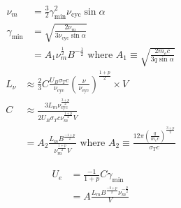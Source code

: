 \begin{enumerate}
{	\begin{multicols}{2}
		\raggedcolumns
		\begin{align*}
			\nu_m &= \frac{3}{2}\gamma_\text{min}^2\nu_\text{cyc}\sin\alpha\\
			\gamma_\text{min} &= \sqrt{\frac{2\nu_m}{3\nu_\text{cyc}\sin\alpha}}\\
				&= A_1\nu_m^\frac{1}{2}B^{-\frac{1}{2}} \text{ where } A_1 \equiv \sqrt{\frac{2m_ec}{3q\sin\alpha}} 
		\end{align*}
		\vfill\columnbreak
		\begin{align*}
			L_\nu &\approx \frac{2}{3}C\frac{U_B\sigma_Tc}{\nu_\text{cyc}}\left(\frac{\nu}{\nu_\text{cyc}}\right)^\frac{1+p}{2}\times V\\
			C &\approx \frac{3L_m\nu_\text{cyc}^\frac{3+p}{2}}{2U_B\sigma_Tc\nu_m^\frac{1+p}{2}V}\\
				&= A_2\frac{L_mB^\frac{-1+p}{2}}{
				\nu_m^\frac{1+p}{2}V} \text{ where } A_2 \equiv \frac{12\pi\left(\frac{q}{m_ec}\right)^\frac{3+p}{2}}{\sigma_Tc}
		\end{align*}
	\end{multicols}
	\begin{align*}
		U_e &= \frac{-1}{1+p}C\gamma_\text{min}\\
			&= A\frac{L_mB^\frac{-2+p}{2}\nu_m^{-\frac{p}{2}}}{V}
	\end{align*}}
\ans{\textcolor{red}{check algebra}}

\qitem{}

\qitem{}
\work{}
\ans{}

\qitem{}
\work{}
\ans{}

\qitem{}
\work{}
\ans{}

\end{enumerate}